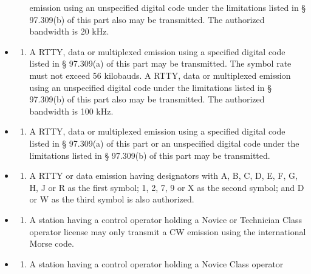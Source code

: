 \documentclass[
  letterpaper,
  DIV=11,
  numbers=noendperiod]{scrreport}
\providecommand{\tightlist}{%
  \setlength{\itemsep}{0pt}\setlength{\parskip}{0pt}}\usepackage{longtable,booktabs,array}
\begin{document}
\begin{itemize}
\begin{enumerate}
    emission using an unspecified digital code under the limitations
    listed in § 97.309(b) of this part also may be transmitted. The
    authorized bandwidth is 20 kHz.
  \end{enumerate}
\item
  \begin{enumerate}
  \def\labelenumi{(\arabic{enumi})}
  \setcounter{enumi}{5}
  \tightlist
  \item
    A RTTY, data or multiplexed emission using a specified digital code
    listed in § 97.309(a) of this part may be transmitted. The symbol
    rate must not exceed 56 kilobauds. A RTTY, data or multiplexed
    emission using an unspecified digital code under the limitations
    listed in § 97.309(b) of this part also may be transmitted. The
    authorized bandwidth is 100 kHz.
  \end{enumerate}
\item
  \begin{enumerate}
  \def\labelenumi{(\arabic{enumi})}
  \setcounter{enumi}{6}
  \tightlist
  \item
    A RTTY, data or multiplexed emission using a specified digital code
    listed in § 97.309(a) of this part or an unspecified digital code
    under the limitations listed in § 97.309(b) of this part may be
    transmitted.
  \end{enumerate}
\item
  \begin{enumerate}
  \def\labelenumi{(\arabic{enumi})}
  \setcounter{enumi}{7}
  \tightlist
  \item
    A RTTY or data emission having designators with A, B, C, D, E, F, G,
    H, J or R as the first symbol; 1, 2, 7, 9 or X as the second symbol;
    and D or W as the third symbol is also authorized.
  \end{enumerate}
\item
  \begin{enumerate}
  \def\labelenumi{(\arabic{enumi})}
  \setcounter{enumi}{8}
  \tightlist
  \item
    A station having a control operator holding a Novice or Technician
    Class operator license may only transmit a CW emission using the
    international Morse code.
  \end{enumerate}
\item
  \begin{enumerate}
  \def\labelenumi{(\arabic{enumi})}
  \setcounter{enumi}{9}
  \tightlist
  \item
    A station having a control operator holding a Novice Class operator

\end{enumerate}
\end{itemize}
\end{document}
